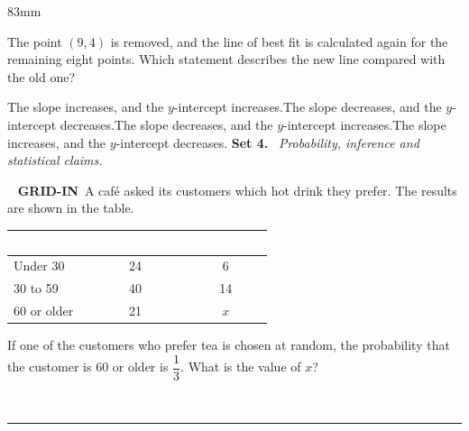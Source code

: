 \documentclass[a4paper]{article}
\newcommand{\COLW}{83mm}
\newcommand{\setkicker}[2]{%
{\sffamily\bfseries\fontsize{12}{14}\selectfont #1.}\ {\itshape\fontsize{11}{14}\selectfont\color{black!75} #2}\par\vspace{2mm}%
}
\newcommand{\pnum}[1]{\fcolorbox{ink}{white}{\sffamily\bfseries\fontsize{8}{8}\selectfont #1}~}
\newcommand{\satg}[2]{%
\noindent\pnum{#1} {\sffamily\bfseries\fontsize{7}{8}\selectfont\color{accent}GRID-IN}\ #2\par\nobreak\vspace{2.5mm}%
\noindent\hspace*{7mm}{\sffamily\fontsize{8.5}{10}\selectfont Answer:}\ \rule[-1.2mm]{28mm}{0.4pt}\par\vspace{5.5mm}%
}
\renewcommand{\arraystretch}{1.3}
\begin{document}
\begin{textblock*}{\COLW}
{{\begin{center}
\end{center}The point $(9,4)$ is removed, and the line of best fit is calculated again for the remaining eight points. Which statement describes the new line compared with the old one?}{The slope increases, and the $y$-intercept increases.}{The slope decreases, and the $y$-intercept decreases.}{The slope decreases, and the $y$-intercept increases.}{The slope increases, and the $y$-intercept decreases.}
\vspace{3mm}
\setkicker{Set 4}{Probability, inference and statistical claims.}
\satg{1}{A café asked its customers which hot drink they prefer. The results are shown in the table.\begin{center}{\small\renewcommand{\arraystretch}{1.15}\setlength{\tabcolsep}{4.5pt}
\begin{tabular}{|l|c|c|}\hline
\cellcolor{accent}\textcolor{white}{\bfseries Age group} & \cellcolor{accent}\textcolor{white}{\bfseries Prefers coffee} & \cellcolor{accent}\textcolor{white}{\bfseries Prefers tea}\\ \hline
Under 30 & 24 & 6\\ \hline
30 to 59 & 40 & 14\\ \hline
60 or older & 21 & $x$\\ \hline
\end{tabular}}\end{center}If one of the customers who prefer tea is chosen at random, the probability that the customer is 60 or older is $\dfrac13$. What is the value of $x$?}
}
\end{textblock*}
\end{document}
